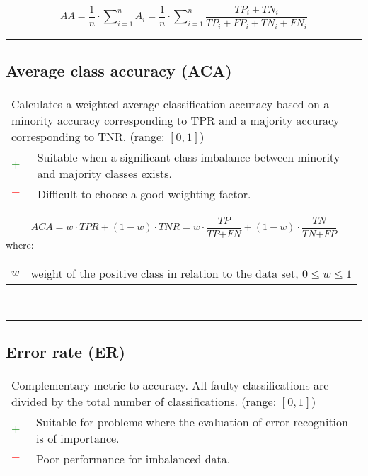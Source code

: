 \documentclass{article}
\makeatletter
\newenvironment{conditions}[1][where:]
	{\hspace{0.02\textwidth} #1 \begin{tabular}[t]{>{$}l<{$} @{${}={}$} l}}
	{\end{tabular}\\[\belowdisplayskip]}
\makeatother
\begin{document}
\begin{equation}
	\textit{AA} = \dfrac{1}{n} \cdot \sum\nolimits_{i = 1}^n A_i = \dfrac{1}{n} \cdot \sum\nolimits_{i = 1}^n \dfrac{\textit{TP}_i + \textit{TN}_i}{\textit{TP}_i + \textit{FP}_i + \textit{TN}_i + \textit{FN}_i}
%
	\label{equation:AA}
\end{equation}

\hrule


\subsection[Average class accuracy (ACA)]{Average class accuracy (ACA) \cite{bhowan2011developing, devarriya2020unbalanced}}

\begin{table}[H]\centering
	\begin{tabular}{m{}m{}}
		\multicolumn{2}{m{0.95\textwidth}}{Calculates a weighted average classification accuracy based on a minority accuracy corresponding to TPR and a majority accuracy corresponding to TNR. (range: $[0, 1]$)} \\
		\textcolor{Green}{$+$} & Suitable when a significant class imbalance between minority and majority classes exists. \\
		\textcolor{Red}{$-$}   & Difficult to choose a good weighting factor.
	\end{tabular}
\end{table}

\begin{equation}
	\textit{ACA} = w \cdot \textit{TPR} + (1 - w) \cdot \textit{TNR} = w \cdot \dfrac{\textit{TP}}{\textit{TP} + \textit{FN}} + (1 - w) \cdot \dfrac{\textit{TN}}{\textit{TN} + \textit{FP}}
%
	\label{equation:ACA}
\end{equation}
%
\begin{conditions}
	w & weight of the positive class in relation to the data set, $0 \le w \le 1$
\end{conditions}

\hrule


\subsection[Error rate (ER)]{Error rate (ER) \cite{hand1986recent, asri2016using}}

\begin{table}[H]\centering
	\begin{tabular}{m{}m{}}
		\multicolumn{2}{m{0.95\textwidth}}{Complementary metric to accuracy. All faulty classifications are divided by the total number of classifications. (range: $[0, 1]$)} \\
		\textcolor{Green}{$+$} & Suitable for problems where the evaluation of error recognition is of importance. \\
		\textcolor{Red}{$-$}   & Poor performance for imbalanced data.
	\end{tabular}
\end{table}
\end{document}
